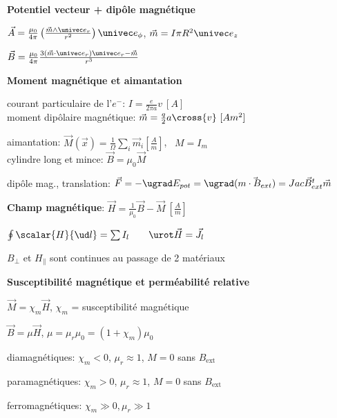   \item \textbf{Potentiel vecteur + dipôle magnétique}
    \squishlist
     \item $\vec A = \frac{\mu_0}{4 \pi} \left( \frac{\vec m \wedge \univec e_r}{r^2} \right) \univec e_\phi$,
           $\vec m = I \pi R^2 \univec e_z$
     \item $\vec B = \frac{\mu_0}{4 \pi} \frac{3 ( \vec m \cdot \univec e_r) \univec e_r - \vec m}{r^3}$
    \squishend
  \squishend

  \squishlist
   \item \textbf{Moment magnétique et aimantation}
    \squishlist
     \item courant particulaire de l'$e^-$: $I = \frac{e}{2 \pi a} v \ [A]$ \\
           moment dipôlaire magnétique: $\vec m = \frac{q}{2} {a}\cross{v} \ [Am^2]$
     \item aimantation: $\vec M (\vec x) = \frac{1}{\Omega} \sum_i \vec m_i [\frac{A}{m}]$,
           \ $M = I_m$ \\
           cylindre long et mince: $\vec B = \mu_0 \vec M$
     \item dipôle mag., translation: $\vec F = -\ugrad E_{pot} = \ugrad (\vec{m\cdot B_{ext}}) = Jac \vec{B}^t_{ext} \vec{m}$
    \squishend

   \item \textbf{Champ magnétique}: $\vec H = \frac{1}{\mu_0} \vec B - \vec M \ [\frac{A}{m}]$
    \squishlist
     \item $\oint \scalar{H}{\ud l} = \sum I_l \qquad \urot \vec H = \vec J_l$
     \item $B_\perp$ et $H_\parallel$ sont continues au passage de 2 matériaux
    \squishend

   \item \textbf{Susceptibilité magnétique et perméabilité relative}
    \squishlist
     \item $\vec M = \chi_m \vec H$, $\chi_m$ = susceptibilité magnétique
     \item $\vec B = \mu \vec H$, $\mu = \mu_r \mu_0 = (1+\chi_m) \mu_0$
    \squishend

   \item diamagnétiques: $\chi_m < 0$, $\mu_r \approx 1$, $M = 0$ sans $B_\textrm{ext}$
   \item paramagnétiques: $\chi_m > 0$, $\mu_r \approx 1$, $M = 0$ sans $B_\textrm{ext}$
   \item ferromagnétiques: $\chi_m \gg 0, \mu_r \gg 1$

